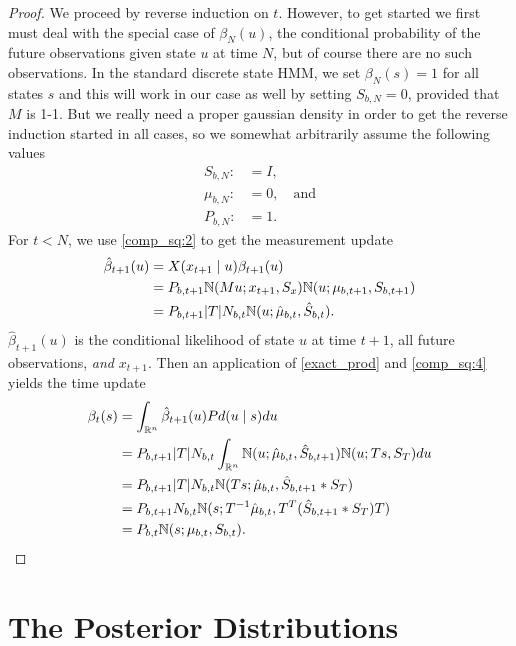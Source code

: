 \documentclass[12pt,leqno]{article}
\begin{document}
\begin{proof}
We proceed by reverse induction on $t$. However, to get started we first must  deal with
the special case of $\beta_{N}(u)$, the conditional probability of the future observations given
state $u$ at time $N$, but of course there are no such observations.  In the standard discrete
state HMM, we set $\beta_N(s) = 1$ for all states $s$ and this will work in our case as well by
setting $S_{b,N} = 0$, provided that $M$ is 1-1. But we really need a proper gaussian 
density in order to get the reverse induction started in all cases, so we somewhat arbitrarily
assume the following values
\begin{align*}
  S_{b,N} :&= I,\\
  \mu_{b,N} :&= 0,\quad\text{and}\\
  P_{b,N} :&= 1.
\end{align*}
  For $t <  N$, we use \eqref{comp_sq:2} to get the measurement update 
  \begin{align*}
    \hat{\beta}_{t+1}(u) &= X(x_{t+1}\mid u)\beta_{t+1}(u)\\
    &= P_{b,t+1}{\mathbb N}(Mu;x_{t+1},S_x){\mathbb N}(u;\mu_{b,t+1},S_{b,t+1})\\
    &= P_{b,t+1}|T|N_{b,t}{\mathbb N}(u;\hat{\mu}_{b,t},\hat{S}_{b,t}).
  \end{align*}
  $\hat{\beta}_{t+1}(u)$ is the conditional likelihood of state $u$ at time $t+1$, all future observations, {\em and}
  $x_{t+1}$. Then an application of \eqref{exact_prod} and \eqref{comp_sq:4} yields the time update
  \begin{align*}
    \beta_t(s) &= \int_{{\mathbb R}^n}\hat{\beta}_{t+1}(u)Pd(u\mid s)du \\
    &= P_{b,t+1}|T|N_{b,t}\int_{{\mathbb R}^n}{\mathbb N}(u;\hat{\mu}_{b,t},\hat{S}_{b,t+1}){\mathbb N}(u;Ts,S_T)du\\
    &=P_{b,t+1}|T|N_{b,t}{\mathbb N}(Ts;\hat{\mu}_{b,t},\hat{S}_{b,t+1}*S_T)\\
    &=P_{b,t+1}N_{b,t}{\mathbb N}(s;T^{-1}\hat{\mu}_{b,t},T^T(\hat{S}_{b,t+1}*S_T)T)\\
    &=P_{b,t}{\mathbb N}(s;\mu_{b,t},S_{b,t}).
  \end{align*}
\end{proof}
\newpage
\section{The Posterior Distributions}
\end{document}

